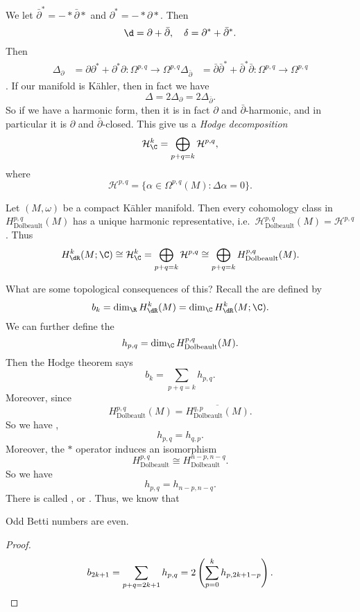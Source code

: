 \documentclass[a4paper]{article}
\newcommand\Dolb{\mathrm{Dolbeault}}
\begin{document}
We let $\bar{\partial}^* = - *\bar{\partial}*$ and $\partial^* = - * \partial *$. Then
\[
  \d = \partial + \bar{\partial},\quad \delta = \partial^* + \bar{\partial}^*.
\]
Then
\begin{align*}
  \Delta_{\partial} &= \partial \partial^* + \partial^* \partial : \Omega^{p, q} \to \Omega^{p, q}
  \Delta_{\bar{\partial}} &= \bar{\partial} \bar{\partial}^* + \bar{\partial}^* \bar{\partial} : \Omega^{p, q} \to \Omega^{p, q}
\end{align*}.
If our manifold is K\"ahler, then in fact we have
\[
  \Delta = 2 \Delta_\partial = 2 \Delta_{\bar{\partial}}.
\]
So if we have a harmonic form, then it is in fact $\partial$ and $\bar{\partial}$-harmonic, and in particular it is $\partial$ and $\bar{\partial}$-closed. This give us a \emph{Hodge decomposition}
\[
  \mathcal{H}^k_\C = \bigoplus_{p + q = k} \mathcal{H}^{p, q},
\]
where
\[
  \mathcal{H}^{p, q} = \{\alpha \in \Omega^{p, q}(M): \Delta \alpha = 0\}.
\]
\begin{thm}
  Let $(M, \omega)$ be a compact K\"ahler manifold. Then every cohomology class in $H_{\Dolb}^{p, q}(M)$ has a unique harmonic representative, i.e.\ $\mathcal{H}^{p, q}_{\Dolb}(M) = \mathcal{H}^{p, q}$. Thus
  \[
    H^k_{\dR} (M; \C) \cong \mathcal{H}^k_{\C} = \bigoplus_{p + q = k} \mathcal{H}^{p, q} \cong \bigoplus_{p + q = k} H_{\Dolb}^{p, q}(M).
  \]
\end{thm}

What are some topological consequences of this? Recall the  are defined by
\[
  b_k = \dim_\R H^k_{\dR}(M) = \dim_\C H^k_{\dR}(M; \C).
\]
We can further define the 
\[
  h_{p, q} = \dim_\C H^{p, q}_{\Dolb}(M).
\]
Then the Hodge theorem says
\[
  b_k = \sum_{p + q = k} h_{p, q}.
\]
Moreover, since
\[
  H_{\Dolb}^{p, q}(M) = \overline{H_{\Dolb}^{q, p}(M)}.
\]
So we have ,
\[
  h_{p, q} = h_{q, p}.
\]
Moreover, the $*$ operator induces an isomorphism
\[
  H^{p, q}_{\Dolb} \cong H_{\Dolb}^{n - p, n - q}.
\]
So we have
\[
  h_{p, q} = h_{n - p, n - q}.
\]
There is called , or . Thus, we know that
\begin{cor}
  Odd Betti numbers are even.
\end{cor}

\begin{proof}
  \[
    b_{2k + 1} = \sum_{p + q = 2k + 1} h_{p, q} = 2 \left(\sum_{p = 0}^k h_{p, 2k + 1 - p}\right).\qedhere
  \]
\end{proof}
\end{document}
